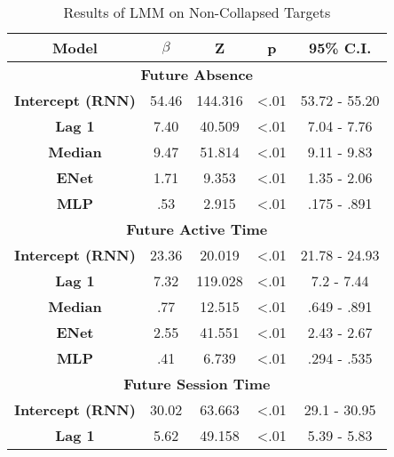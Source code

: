 \begin{table}[h]
\centering
\caption{Results of LMM on Non-Collapsed Targets}
\label{exploded_lmm_33}
\begin{tabular}{ccccc}
\hline
\textbf{Model}  & \textbf{$\beta$} & \textbf{Z} & \textbf{p} & \textbf{95\% C.I.}                  \\ \hline
\multicolumn{5}{c}{\textbf{Future Absence}}                                                                         \\ \hline
\textbf{Intercept (RNN)} & 54.46                & 144.316     & \textless .01   & 53.72 - 55.20                     \\
\textbf{Lag 1}           & 7.40                & 40.509     & \textless .01   & 7.04 - 7.76                     \\
\textbf{Median}          & 9.47                & 51.814     & \textless .01   & 9.11 - 9.83                     \\
\textbf{ENet}            & 1.71                & 9.353     & \textless .01   & 1.35 - 2.06                     \\
\textbf{MLP}             & .53                & 2.915     & \textless .01   & .175 - .891                       \\ \hline
\multicolumn{5}{c}{\textbf{Future Active Time}}                                                                     \\ \hline
\textbf{Intercept (RNN)} & 23.36                & 20.019      & \textless .01  & 21.78 - 24.93                     \\
\textbf{Lag 1}           & 7.32               & 119.028    & \textless .01  & 7.2 - 7.44                     \\
\textbf{Median}          & .77                & 12.515     & \textless .01  & .649 - .891                     \\
\textbf{ENet}            & 2.55                & 41.551     & \textless .01  & 2.43 - 2.67                     \\
\textbf{MLP}             & .41                & 6.739      & \textless .01  & .294 - .535                     \\ \hline
\multicolumn{5}{c}{\textbf{Future Session Time}}                                                                     \\ \hline
\textbf{Intercept (RNN)} & 30.02                & 63.663     & \textless .01  & 29.1 - 30.95                     \\
\textbf{Lag 1}            & 5.62                & 49.158     & \textless .01  & 5.39 - 5.83                     \\

\end{tabular}
\end{table}
